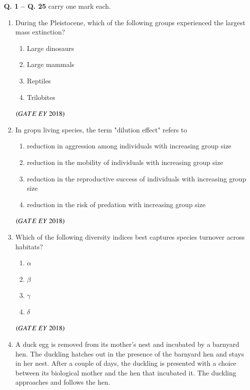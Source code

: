 \documentclass[journal]{IEEEtran}
\numberwithin{equation}{enumi}
\numberwithin{figure}{enumi}
\begin{document}
\newpage
\noindent \textbf{Q. 1 -- Q. \textbf{25}} carry one mark each.\\
\begin{enumerate}

\item During the Pleistocene, which of the following groups experienced the largest mass extinction?
    \begin{enumerate}
        \item Large dinosaurs
        \item Large mammals
        \item Reptiles
        \item Trilobites
    \end{enumerate}
    \hfill{$\brak{ GATE\ EY\ 2018}$}
    \bigskip
\item In gropu living species, the term "dilution effect" refers to
    \begin{enumerate}
        \item reduction in aggression among individuals with increasing group size
        \item reduction in the mobility of individuals with increasing group size
        \item reduction in the reproductive success of individuals with increasing group size
        \item reduction in the risk of predation with increasing group size
    \end{enumerate}
    \hfill{$\brak{ GATE\ EY\ 2018}$}
    \bigskip
\item Which of the following diversity indices best captures species turnover across habitats?
\begin{multicols}{4}
    \begin{enumerate}
        \item $\alpha$
        \item $\beta$
        \item $\gamma$
        \item $\delta$
    \end{enumerate}
    \end{multicols}
    \hfill{$\brak{ GATE\ EY\ 2018}$}
    \bigskip
\item A duck egg is removed from its mother's nest and incubated by a barnyard hen. The
duckling hatches out in the presence of the barnyard hen and stays in her nest. After
a couple of days, the duckling is presented with a choice between its biological
mother and the hen that incubated it. The duckling approaches and follows the hen.

\end{enumerate}
\end{document}

